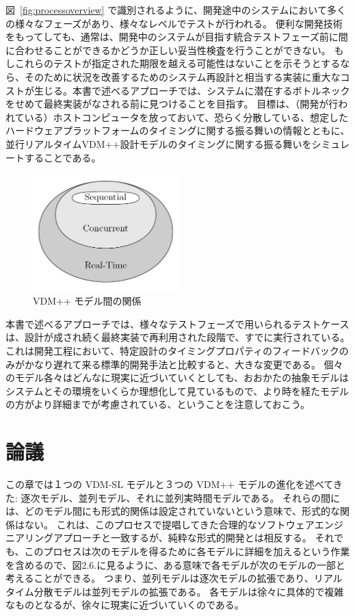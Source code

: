 \documentclass[\pformat,12pt]{jreport}
\begin{document}
図~\ref{fig:processoverview} で識別されるように、開発途中のシステムにおいて多くの様々なフェーズがあり、様々なレベルでテストが行われる。
便利な開発技術をもってしても、通常は、開発中のシステムが目指す統合テストフェーズ前に間に合わせることができるかどうか正しい妥当性検査を行うことができない。
もしこれらのテストが指定された期限を越える可能性はないことを示そうとするなら、そのために状況を改善するためのシステム再設計と相当する実装に重大なコストが生じる。本書で述べるアプローチでは、システムに潜在するボトルネックをせめて最終実装がなされる前に見つけることを目指す。
目標は、（開発が行われている）ホストコンピュータを放っておいて、恐らく分散している、想定したハードウェアプラットフォームのタイミングに関する振る舞いの情報とともに、並行リアルタイムVDM++設計モデルのタイミングに関する振る舞いをシミュレートすることである。

\begin{figure}
\begin{center}
\includegraphics[width=0.5\textwidth]{VDM++levelsofmodels}
\end{center}
\caption{VDM++ モデル間の関係}\label{fig:relationship}
\end{figure}

本書で述べるアプローチでは、様々なテストフェーズで用いられるテストケースは、設計が成され続く最終実装で再利用された段階で、すでに実行されている。
これは開発工程において、特定設計のタイミングプロパティのフィードバックのみがかなり遅れて来る標準的開発手法と比較すると、大きな変更である。
個々のモデル各々はどんなに現実に近づいていくとしても、おおかたの抽象モデルはシステムとその環境をいくらか理想化して見ているもので、より時を経たモデルの方がより詳細までが考慮されている、ということを注意しておこう。

\section{論議}

この章では１つの VDM-SL モデルと３つの VDM++ モデルの進化を述べてきた: 逐次モデル、並列モデル、それに並列実時間モデルである。
それらの間には、どのモデル間にも形式的関係は設定されていないという意味で、形式的な関係はない。
これは、このプロセスで提唱してきた合理的なソフトウェアエンジニアリングアプローチと一致するが、純粋な形式的開発とは相反する。
それでも、このプロセスは次のモデルを得るために各モデルに詳細を加えるという作業を含めるので、図2.6.に見るように、ある意味で各モデルが次のモデルの一部と考えることができる。
つまり、並列モデルは逐次モデルの拡張であり、リアルタイム分散モデルは並列モデルの拡張である。
各モデルは徐々に具体的で複雑なものとなるが、徐々に現実に近づいていくのである。
\end{document}
